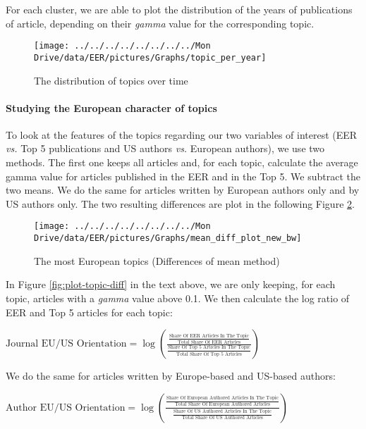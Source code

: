 \documentclass[
]{article}
\begin{document}
For each cluster, we are able to plot the distribution of the years of
publications of article, depending on their \emph{gamma} value for the
corresponding topic.

\begin{figure}[h]

{\centering \texttt{[image: ../../../../../../../../Mon Drive/data/EER/pictures/Graphs/topic\_per\_year]} 

}

\caption{The distribution of topics over time}\label{fig:plot-topic-year}
\end{figure}

\hypertarget{studying-the-european-character-of-topics}{%
\paragraph*{Studying the European character of
topics}\label{studying-the-european-character-of-topics}}

To look at the features of the topics regarding our two variables of
interest (EER \emph{vs.} Top 5 publications and US authors \emph{vs.}
European authors), we use two methods. The first one keeps all articles
and, for each topic, calculate the average gamma value for articles
published in the EER and in the Top 5. We subtract the two means. We do
the same for articles written by European authors only and by US authors
only. The two resulting differences are plot in the following Figure
\ref{fig:plot-topic-diff-alternative}.

\begin{figure}[h]

{\centering \texttt{[image: ../../../../../../../../Mon Drive/data/EER/pictures/Graphs/mean\_diff\_plot\_new\_bw]} 

}

\caption{The most European topics (Differences of mean method)}\label{fig:plot-topic-diff-alternative}
\end{figure}

In Figure \ref{fig:plot-topic-diff} in the text above, we are only
keeping, for each topic, articles with a \emph{gamma} value above 0.1.
We then calculate the log ratio of EER and Top 5 articles for each
topic:

\bigskip

\({\scriptstyle \text{Journal EU/US Orientation}=\log(\frac{\frac{\text{Share Of EER Articles In The Topic}}{\text{Total Share Of EER Articles}}} {\frac{\text{Share Of Top 5 Articles In The Topic}}{\text{Total Share Of Top 5 Articles}}})}\)

\bigskip

We do the same for articles written by Europe-based and US-based
authors:

\bigskip

\({\scriptstyle \text{Author EU/US Orientation}=\log(\frac{\frac{\text{Share Of European Authored Articles In The Topic}}{\text{Total Share Of European Authored Articles}}} {\frac{\text{Share Of US Authored Articles In The Topic}}{\text{Total Share Of US Authored Articles}}})}\)
\end{document}

